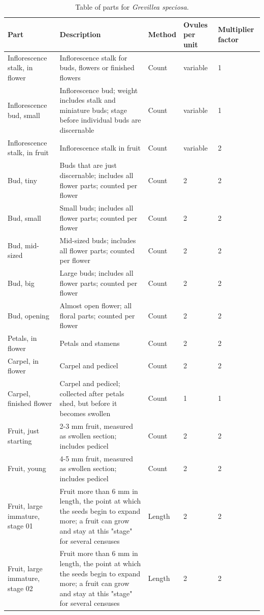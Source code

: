 \documentclass[10pt,twoside]{article}\usepackage[]{graphicx}\usepackage[]{color}
\begin{document}
\clearpage
\begingroup\small
\begin{longtable}{p{4.5cm}p{6cm}p{2cm}p{1cm}p{1cm}}
\caption{Table of parts for \emph{Grevillea speciosa}.} \\ 
  \hline
Part & Description & Method & Ovules per unit & Multiplier factor \\ 
  \hline
Inflorescence stalk, in flower & Inflorescence stalk for buds, flowers or finished flowers & Count & variable &   1 \\ 
  Inflorescence bud, small & Inflorescence bud; weight includes stalk and miniature buds; stage before individual buds are discernable & Count & variable &   1 \\ 
  Inflorescence stalk, in fruit & Inflorescence stalk in fruit & Count & variable &   2 \\ 
  Bud, tiny & Buds that are just discernable; includes all flower parts; counted per flower & Count & 2 &   2 \\ 
  Bud, small & Small buds; includes all flower parts; counted per flower & Count & 2 &   2 \\ 
  Bud, mid-sized & Mid-sized buds; includes all flower parts; counted per flower & Count & 2 &   2 \\ 
  Bud, big & Large buds; includes all flower parts; counted per flower & Count & 2 &   2 \\ 
  Bud, opening & Almost open flower; all floral parts; counted per flower & Count & 2 &   2 \\ 
  Petals, in flower & Petals and stamens & Count & 2 &   2 \\ 
  Carpel, in flower & Carpel and pedicel & Count & 2 &   2 \\ 
  Carpel, finished flower & Carpel and pedicel; collected after petals shed, but before it becomes swollen & Count & 1 &   1 \\ 
  Fruit, just starting & 2-3 mm fruit, measured as swollen section; includes pedicel & Count & 2 &   2 \\ 
  Fruit, young & 4-5 mm fruit, measured as swollen section; includes pedicel & Count & 2 &   2 \\ 
  Fruit, large immature, stage 01 & Fruit more than 6 mm in length, the point at which the seeds begin to expand more; a fruit can grow and stay at this "stage" for several censuses & Length & 2 &   2 \\ 
  Fruit, large immature, stage 02 & Fruit more than 6 mm in length, the point at which the seeds begin to expand more; a fruit can grow and stay at this "stage" for several censuses & Length & 2 &   2 \\ 

\end{longtable}
\end{document}
